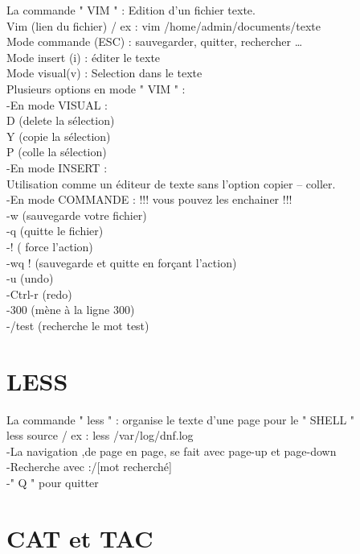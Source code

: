 \documentclass[11pt,a4peper]{article}
\begin{document}
La commande " VIM " : Edition d’un fichier texte.\\
Vim (lien du fichier) / ex : vim /home/admin/documents/texte\\
Mode commande (ESC) : sauvegarder, quitter, rechercher …\\
Mode insert (i) : éditer le texte\\
Mode visual(v) : Selection dans le texte\\

Plusieurs options en mode " VIM " :\\

-En mode VISUAL :\\
D (delete la sélection)\\
Y (copie la sélection)\\
P (colle la sélection)\\

-En mode INSERT :\\
Utilisation comme un éditeur de texte sans l’option copier – coller.\\


-En mode COMMANDE : !!! vous pouvez les enchainer !!!\\
-w (sauvegarde votre fichier)\\
-q (quitte le fichier)\\
-! ( force l’action)\\
-wq ! (sauvegarde et quitte en forçant l’action)\\
-u (undo)\\
-Ctrl-r (redo)\\
-300 (mène à la ligne 300)\\
-/test (recherche le mot test)\\

\section{LESS}

La commande " less " : organise le texte d’une page pour le " SHELL "\\
less source / ex : less /var/log/dnf.log\\
-La navigation ,de page en page, se fait avec page-up et page-down\\
-Recherche avec :/[mot recherché]\\
-" Q " pour quitter\\

\section{CAT et TAC}
\end{document}
